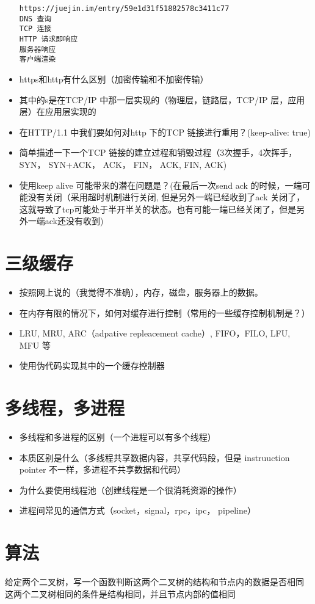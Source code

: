 \documentclass[11pt]{article}
\begin{document}
\begin{itemize}
\begin{verbatim}
https://juejin.im/entry/59e1d31f51882578c3411c77
DNS 查询
TCP 连接
HTTP 请求即响应
服务器响应
客户端渲染
\end{verbatim}
\item https和http有什么区别（加密传输和不加密传输）
\item 其中的s是在TCP/IP 中那一层实现的（物理层，链路层，TCP/IP 层，应用层）在应用层实现的
\item 在HTTP/1.1 中我们要如何对http 下的TCP 链接进行重用？(keep-alive: true)
\item 简单描述一下一个TCP 链接的建立过程和销毁过程（3次握手，4次挥手， SYN， SYN+ACK， ACK， FIN， ACK, FIN, ACK)
\item 使用keep alive 可能带来的潜在问题是？(在最后一次send ack 的时候，一端可能没有关闭（采用超时机制进行关闭,  但是另外一端已经收到了ack 关闭了，这就导致了tcp可能处于半开半关的状态。也有可能一端已经关闭了，但是另外一端ack还没有收到)
\end{itemize}

\section{三级缓存}
\label{sec:org5fec4f4}
\begin{itemize}
\item 按照网上说的（我觉得不准确），内存，磁盘，服务器上的数据。
\item 在内存有限的情况下，如何对缓存进行控制（常用的一些缓存控制机制是？）
\item LRU, MRU, ARC（adpative repleacement cache）, FIFO，FILO, LFU, MFU 等
\item 使用伪代码实现其中的一个缓存控制器
\end{itemize}
\section{多线程，多进程}
\label{sec:org6f57edd}
\begin{itemize}
\item 多线程和多进程的区别（一个进程可以有多个线程）
\item 本质区别是什么（多线程共享数据内容，共享代码段，但是 instruuction pointer 不一样，多进程不共享数据和代码）
\item 为什么要使用线程池（创建线程是一个很消耗资源的操作）
\item 进程间常见的通信方式（socket，signal，rpc，ipc， pipeline）
\end{itemize}

\section{算法}
\label{sec:org1c7abc9}
给定两个二叉树，写一个函数判断这两个二叉树的结构和节点内的数据是否相同
这两个二叉树相同的条件是结构相同，并且节点内部的值相同
\end{document}
